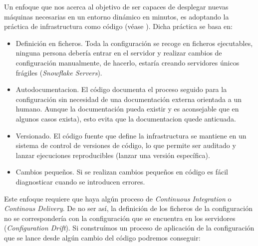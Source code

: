 Un enfoque que nos acerca al objetivo de ser capaces de desplegar nuevas máquinas necesarias en un entorno dinámico en minutos, es adoptando la práctica
de infrastructura como código (véase \cite{fowler-infra-as-code}). Dicha práctica se basa en:

\begin{itemize}
    \item Definición en ficheros. Toda la configuración se recoge en ficheros ejecutables, ninguna persona debería entrar en el servidor
    y realizar cambios de configuración manualmente, de hacerlo, estaría creando servidores únicos frágiles (\emph{Snowflake Servers}).
    \item Autodocumentacion. El código documenta el proceso seguido para la configuración sin necesidad de una documentación externa orientada a un humano. Aunque la documentación pueda existir y es aconsejable que en algunos casos exista), esto evita que la documentacion quede anticuada.
    \item Versionado. El código fuente que define la infrastructura se mantiene en un sistema de control de versiones de código, lo que permite ser auditado y lanzar ejecuciones reproducibles (lanzar una versión específica).
    \item Cambios pequeños. Si se realizan cambios pequeños en código es fácil diagnosticar cuando se introducen errores.
\end{itemize}
 
Este enfoque requiere que haya algún proceso de \emph{Continuous Integration} o \emph{Continous Delivery}. De no ser así, la definición de los ficheros
de la configuración no se correspondería con la configuración que se encuentra en los servidores (\emph{Configuration Drift}). Si construímos 
un proceso de aplicación de la configuración que se lance desde algún cambio del código podremos conseguir:

